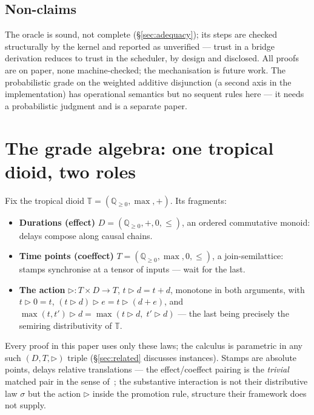 \documentclass[11pt]{article}
\newcommand{\act}{\mathbin{\rhd}}                %
\newcommand{\TT}{\mathbb{T}}                     %
\newcommand{\QQ}{\mathbb{Q}}                     %
\theoremstyle{definition}
\theoremstyle{remark}
\begin{document}
\subsection{Non-claims}

The oracle is sound, not complete (\S\ref{sec:adequacy}); its steps are checked
structurally by the kernel and reported as unverified --- trust in a bridge
derivation reduces to trust in the scheduler, by design and disclosed.  All
proofs are on paper, none machine-checked; the mechanisation is future work.
The probabilistic grade on the weighted additive disjunction (a second axis in
the implementation) has operational semantics but no sequent rules here --- it
needs a probabilistic judgment and is a separate paper.

\section{The grade algebra: one tropical dioid, two roles}
\label{sec:algebra}

Fix the tropical dioid $\TT = (\QQ_{\geq 0}, \max, +)$.  Its fragments:

\begin{itemize}
\item \textbf{Durations (effect)} $D = (\QQ_{\geq 0}, +, 0, \leq)$, an ordered
  commutative monoid: delays compose along causal chains.
\item \textbf{Time points (coeffect)} $T = (\QQ_{\geq 0}, \max, 0, \leq)$, a
  join-semilattice: stamps synchronise at a tensor of inputs --- wait for the
  last.
\item \textbf{The action} ${\act} : T \times D \to T$, $t \act d = t+d$,
  monotone in both arguments, with $t \act 0 = t$, $(t \act d) \act e = t \act
  (d+e)$, and $\max(t,t') \act d = \max(t \act d,\; t' \act d)$ --- the last
  being precisely the semiring distributivity of $\TT$.
\end{itemize}

Every proof in this paper uses only these laws; the calculus is parametric in
any such $(D, T, \act)$ triple (\S\ref{sec:related} discusses instances).
Stamps are absolute points, delays relative translations --- the effect/coeffect
pairing is the \emph{trivial} matched pair in the sense
of~\cite{GaboardiICFP2016}; the substantive interaction is not their
distributive law $\sigma$ but the action $\act$ inside the promotion rule,
structure their framework does not supply.
\end{document}
